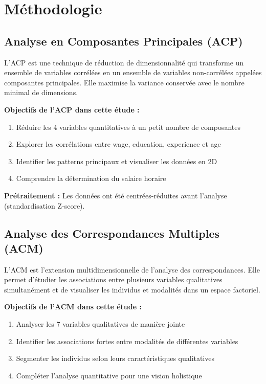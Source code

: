 \documentclass[12pt,a4paper]{report}
\begin{document}
\section{Méthodologie}

\subsection{Analyse en Composantes Principales (ACP)}

L'ACP est une technique de réduction de dimensionnalité qui transforme un ensemble de variables corrélées en un ensemble de variables non-corrélées appelées composantes principales. Elle maximise la variance conservée avec le nombre minimal de dimensions.

\textbf{Objectifs de l'ACP dans cette étude :}
\begin{enumerate}
    \item Réduire les 4 variables quantitatives à un petit nombre de composantes
    \item Explorer les corrélations entre wage, education, experience et age
    \item Identifier les patterns principaux et visualiser les données en 2D
    \item Comprendre la détermination du salaire horaire
\end{enumerate}

\textbf{Prétraitement :} Les données ont été centrées-réduites avant l'analyse (standardisation Z-score).

\subsection{Analyse des Correspondances Multiples (ACM)}

L'ACM est l'extension multidimensionnelle de l'analyse des correspondances. Elle permet d'étudier les associations entre plusieurs variables qualitatives simultanément et de visualiser les individus et modalités dans un espace factoriel.

\textbf{Objectifs de l'ACM dans cette étude :}
\begin{enumerate}
    \item Analyser les 7 variables qualitatives de manière jointe
    \item Identifier les associations fortes entre modalités de différentes variables
    \item Segmenter les individus selon leurs caractéristiques qualitatives
    \item Compléter l'analyse quantitative pour une vision holistique
\end{enumerate}
\end{document}
